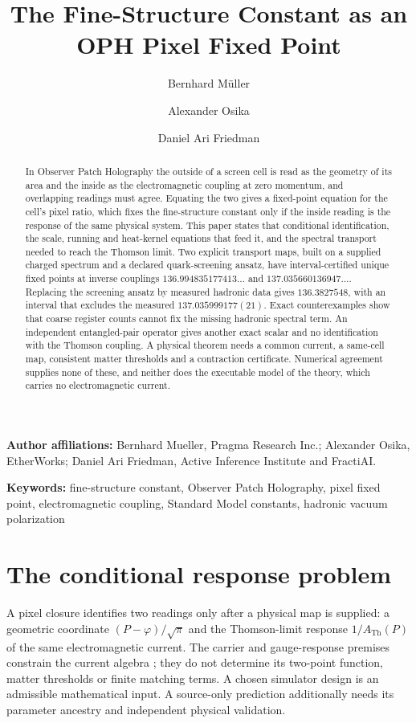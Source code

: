 \documentclass[11pt]{article}
\title{\textbf{The Fine-Structure Constant as an OPH Pixel Fixed Point}}
\author{Bernhard M\"uller \and Alexander Osika \and Daniel Ari Friedman}
\date{\OPHPaperReleaseDate}
\theoremstyle{remark}
\newcommand{\ATh}{A_{\mathrm{Th}}}
\begin{document}
\maketitle
\OPHPaperReleaseBanner

\begin{center}
\small\textbf{Author affiliations:} Bernhard Mueller, Pragma Research Inc.; Alexander Osika, EtherWorks; Daniel Ari Friedman, Active Inference Institute and FractiAI.
\end{center}

\begin{abstract}
In Observer Patch Holography the outside of a screen cell is read as the
geometry of its area and the inside as the electromagnetic coupling at zero
momentum, and overlapping readings must agree. Equating the two gives a
fixed-point equation for the cell's pixel ratio, which fixes the
fine-structure constant only if the inside reading is the response of the
same physical system. This paper states that conditional identification, the
scale, running and heat-kernel equations that feed it, and the spectral
transport needed to reach the Thomson limit. Two explicit transport maps,
built on a supplied charged spectrum and a declared quark-screening ansatz,
have interval-certified unique fixed points at inverse couplings
$136.994835177413\ldots$ and $137.035660136947\ldots$. Replacing the
screening ansatz by measured hadronic data gives $136.3827548$, with an
interval that excludes the measured $137.035999177(21)$. Exact
counterexamples show that
coarse register counts cannot fix the missing hadronic spectral term. An
independent entangled-pair operator gives another exact scalar and no
identification with the Thomson coupling. A physical theorem needs a common
current, a same-cell map, consistent matter thresholds and a contraction
certificate. Numerical agreement supplies none of these, and neither does the
executable model of the theory, which carries no electromagnetic current.
\end{abstract}

\noindent\textbf{Keywords:} fine-structure constant, Observer Patch Holography, pixel fixed
point, electromagnetic coupling, Standard Model constants, hadronic vacuum polarization


\section{The conditional response problem}

A pixel closure identifies two readings only after a physical map is
supplied: a geometric coordinate $(P-\varphi)/\sqrt\pi$ and the
Thomson-limit response $1/\ATh(P)$ of the same electromagnetic current.
The carrier and gauge-response premises constrain the current algebra
\cite{oph-smgr}; they do not determine its two-point function, matter
thresholds or finite matching terms. A chosen simulator design is an
admissible mathematical input. A source-only prediction additionally needs
its parameter ancestry and independent physical validation.
\end{document}
